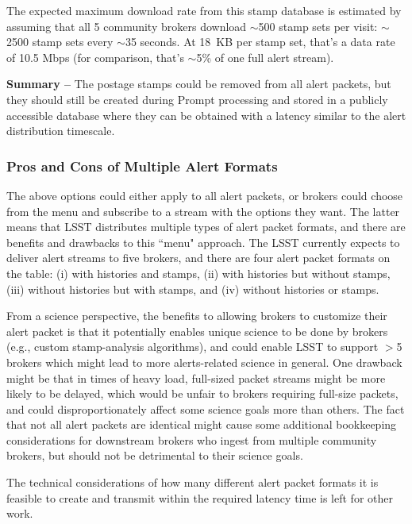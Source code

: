 \documentclass[DM,lsstdraft,authoryear,toc]{lsstdoc}
\begin{document}
The expected maximum download rate from this stamp database is estimated by assuming that all 5 community brokers download $\sim$500 stamp sets per visit: $\sim$2500 stamp sets every $\sim$35 seconds. At 18~KB per stamp set, that's a data rate of 10.5 Mbps (for comparison, that's $\sim$5\% of one full alert stream).

{\bf Summary --} The postage stamps could be removed from all alert packets, but they should still be created during Prompt processing and stored in a publicly accessible database where they can be obtained with a latency similar to the alert distribution timescale.


\subsubsection{Pros and Cons of Multiple Alert Formats}\label{sssec:packets_remove_procon}

The above options could either apply to all alert packets, or brokers could choose from the menu and subscribe to a stream with the options they want.
The latter means that LSST distributes multiple types of alert packet formats, and there are benefits and drawbacks to this ``menu" approach.
The LSST currently expects to deliver alert streams to five brokers, and there are four alert packet formats on the table: (i) with histories and stamps, (ii) with histories but without stamps, (iii) without histories but with stamps, and (iv) without histories or stamps. 

From a science perspective, the benefits to allowing brokers to customize their alert packet is that it potentially enables unique science to be done by brokers (e.g., custom stamp-analysis algorithms), and could enable LSST to support $>$5 brokers which might lead to more alerts-related science in general.
One drawback might be that in times of heavy load, full-sized packet streams might be more likely to be delayed, which would be unfair to brokers requiring full-size packets, and could disproportionately affect some science goals more than others.
The fact that not all alert packets are identical might cause some additional bookkeeping considerations for downstream brokers who ingest from multiple community brokers, but should not be detrimental to their science goals.

The technical considerations of how many different alert packet formats it is feasible to create and transmit within the required latency time is left for other work.
\end{document}
